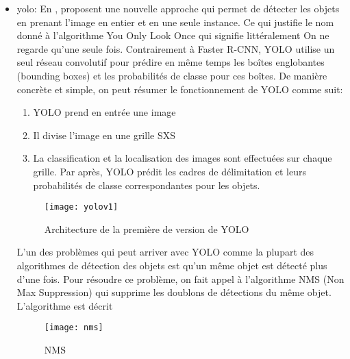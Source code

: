 \begin{itemize}
            \item \acrfull{yolo}: En \citeyear{redmon2016look}, \citeauthor{redmon2016look} proposent une nouvelle approche qui permet de détecter les objets en prenant l’image en entier et en une seule instance. Ce qui justifie le nom donné à l’algorithme You Only Look Once qui signifie littéralement On ne regarde qu’une seule fois. Contrairement à Faster R-CNN, YOLO utilise un seul réseau convolutif pour prédire en même temps les boîtes englobantes (bounding boxes) et les probabilités de classe pour ces boîtes.
            De manière concrète et simple, on peut résumer le fonctionnement de YOLO comme suit:
                \begin{enumerate}
                    \item YOLO prend en entrée une image
                    \item Il divise l’image en une grille SXS
                    \item La classification et la localisation des images sont effectuées sur chaque grille. Par après, YOLO prédit les cadres de délimitation et leurs probabilités de classe correspondantes pour les objets. 
                \end{enumerate}
                \begin{figure}[H]
                    \centering
                    \texttt{[image: yolov1]}
                    \caption{Architecture de la première de version de YOLO}
                \end{figure}
            L’un des problèmes qui peut arriver avec YOLO comme la plupart des algorithmes de détection des objets est qu’un même objet est détecté plus d’une fois. Pour résoudre ce problème, on fait appel à l’algorithme NMS (Non Max Suppression) qui supprime les doublons de détections du même objet. L’algorithme est décrit
                
            \begin{figure}[H]
                \centering
                \texttt{[image: nms]}
                \caption{NMS}
            \end{figure}


\end{itemize}
